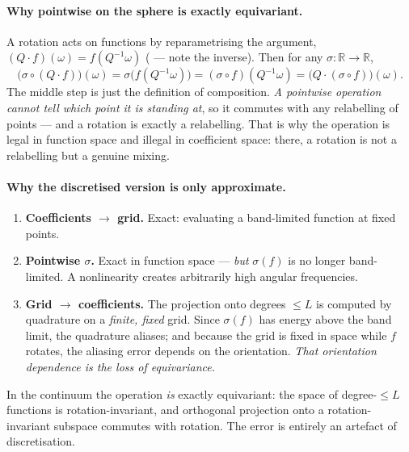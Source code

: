 \documentclass[11pt,a4paper]{report}
\theoremstyle{definition}
\theoremstyle{remark}
\newcommand{\RR}{\mathbb R}
\begin{document}
\paragraph{Why pointwise on the sphere is exactly equivariant.} A rotation
acts on functions by reparametrising the argument,
$(Q\cdot f)(\omega)=f(Q^{-1}\omega)$ ( ---
note the inverse). Then for any $\sigma:\RR\to\RR$,
\[
\bigl(\sigma\circ(Q\cdot f)\bigr)(\omega)
=\sigma\bigl(f(Q^{-1}\omega)\bigr)
=(\sigma\circ f)(Q^{-1}\omega)
=\bigl(Q\cdot(\sigma\circ f)\bigr)(\omega).
\]
The middle step is just the definition of composition. \emph{A pointwise
operation cannot tell which point it is standing at}, so it commutes with any
relabelling of points --- and a rotation is exactly a relabelling. That is why
the operation is legal in function space and illegal in coefficient space:
there, a rotation is not a relabelling but a genuine mixing.

\paragraph{Why the discretised version is only approximate.}
\begin{enumerate}[nosep]
\item \textbf{Coefficients $\to$ grid.} Exact: evaluating a band-limited
function at fixed points.
\item \textbf{Pointwise $\sigma$.} Exact in function space --- \emph{but}
$\sigma(f)$ is no longer band-limited. A nonlinearity creates arbitrarily
high angular frequencies.
\item \textbf{Grid $\to$ coefficients.} The projection onto degrees $\le L$
is computed by quadrature on a \emph{finite, fixed} grid. Since $\sigma(f)$
has energy above the band limit, the quadrature aliases; and because the grid
is fixed in space while $f$ rotates, the aliasing error depends on the
orientation. \emph{That orientation dependence is the loss of equivariance.}
\end{enumerate}
In the continuum the operation \emph{is} exactly equivariant: the space of
degree-$\le L$ functions is rotation-invariant, and orthogonal projection
onto a rotation-invariant subspace commutes with rotation. The error is
entirely an artefact of discretisation.
\end{document}
